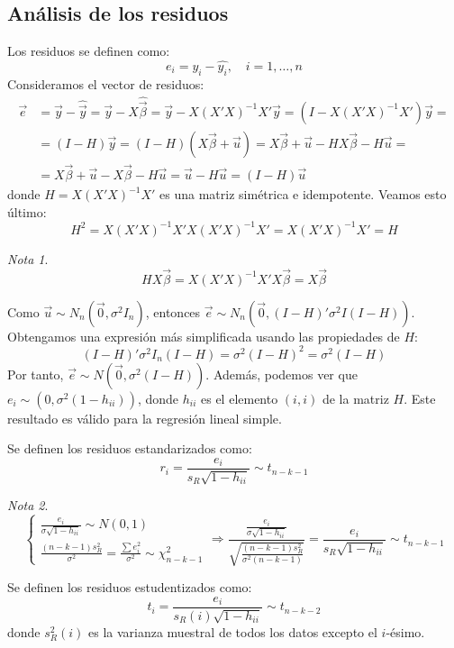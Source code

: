 \documentclass{report}
\theoremstyle{remark}
\theoremstyle{remark}
\newtheorem*{note}{Nota}
\theoremstyle{remark}
\theoremstyle{definition}
\theoremstyle{definition}
\theoremstyle{definition}
\begin{document}
\subsection*{Análisis de los residuos}
Los residuos se definen como:
$$e_i = y_i - \hat{y_i}, \quad i = 1, \dots, n$$
Consideramos el vector de residuos:
\begin{align*}
    \vec{e} & = \vec{y} - \hat{\vec{y}} = \vec{y} - X\hat{\vec{\beta}} = \vec{y} - X(X'X)^{-1}X'\vec{y} = (I - X(X'X)^{-1}X')\vec{y} = \\
            & = (I-H)\vec{y} = (I-H)(X\vec{\beta}+\vec{u}) = X\vec{\beta} + \vec{u} - HX\vec{\beta} - H\vec{u} =                       \\
            & = X\vec{\beta} + \vec{u} - X\vec{\beta} - H\vec{u} = \vec{u} - H\vec{u} = (I-H)\vec{u}
\end{align*}
donde $H = X(X'X)^{-1}X'$ es una matriz simétrica e idempotente.
Veamos esto último:
$$H^2 = X(X'X)^{-1}X'X(X'X)^{-1}X' = X(X'X)^{-1}X' = H$$

\begin{note}
    $$HX\vec{\beta} = X(X'X)^{-1}X'X\vec{\beta} = X\vec{\beta}$$
\end{note}

Como $\vec{u} \sim N_n(\vec{0}, \sigma^2I_n)$, entonces $\vec{e} \sim N_n(\vec{0}, (I-H)'\sigma^2I(I-H))$.
Obtengamos una expresión más simplificada usando las propiedades de $H$:
$$(I-H)'\sigma^2I_n(I-H) = \sigma^2(I-H)^2 = \sigma^2(I-H)$$
Por tanto, $\vec{e} \sim N(\vec{0}, \sigma^2(I-H))$.
Además, podemos ver que $e_i \sim (0, \sigma^2(1-h_{ii}))$, donde $h_{ii}$ es el elemento $(i,i)$ de la matriz $H$.
Este resultado es válido para la regresión lineal simple.

Se definen los residuos estandarizados como:
$$r_i = \frac{e_i}{s_R\sqrt{1-h_{ii}}} \sim t_{n-k-1}$$

\begin{note}
    $$\begin{cases}
            \frac{e_i}{\sigma\sqrt{1-h_{ii}}} \sim N(0, 1) \\
            \frac{(n-k-1)s_R^2}{\sigma^2} = \frac{\sum e_i^2}{\sigma^2} \sim \chi^2_{n-k-1}
        \end{cases} \Rightarrow
        \frac{\frac{e_i}{\sigma\sqrt{1-h_{ii}}}}{\sqrt{\frac{(n-k-1)s_R^2}{\sigma^2(n-k-1)}}} = \frac{e_i}{s_R\sqrt{1-h_{ii}}} \sim t_{n-k-1}$$
\end{note}

Se definen los residuos estudentizados como:
$$t_i = \frac{e_i}{s_R(i)\sqrt{1-h_{ii}}} \sim t_{n-k-2}$$
donde $s_R^2(i)$ es la varianza muestral de todos los datos excepto el $i$-ésimo.
\end{document}
